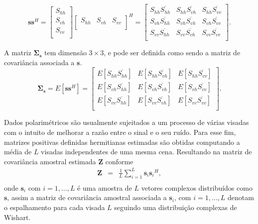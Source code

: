 \begin{equation}\label{cap_acf_6}
\mathbf{s}\mathbf{s}^H = \left[
\begin{array}{c}
	S_{hh}      \\
        S_{vh}     \\
	S_{vv}      \\
\end{array}
\right]
\left[
\begin{array}{ccc}
	S_{hh}  & S_{vh}  & S_{vv}      \\
\end{array}
\right]^H = 
\left[
\begin{array}{ccc}
	S_{hh}\overline{S_{hh}} & S_{hh} \overline{S_{vh}} & S_{hh}  \overline{S_{vv}}     \\
	S_{vh} \overline{S_{hh}}  & S_{vh} \overline{S_{vh}}  & S_{vh} \overline{S_{vv}}      \\
	S_{vv} \overline{S_{hh}}  & S_{vv} \overline{S_{vh}}  & S_{vv}  \overline{S_{vv}}     \\
\end{array}
\right].
\end{equation}

A  matriz $\mathbf \Sigma_{{\mathbf s}}$ tem dimensão $3\times 3$, e pode ser definida como sendo a matriz de covariância associada a $\mathbf{s}$.
\begin{equation}\label{cap_acf_7}
\mathbf{\Sigma_{{\mathbf s}}} = E[\mathbf{s}\mathbf{s}^H] =
\left[
\begin{array}{ccc}
	E[S_{hh}\overline{S_{hh}}] & E[S_{hh} \overline{S_{vh}}] & E[S_{hh}  \overline{S_{vv}}]     \\
	E[S_{vh} \overline{S_{hh}}]  & E[S_{vh} \overline{S_{vh}}]  & E[S_{vh} \overline{S_{vv}}]      \\
	E[S_{vv} \overline{S_{hh}}]  & E[S_{vv} \overline{S_{vh}}]  & E[S_{vv}  \overline{S_{vv}}]     \\
\end{array}
\right].  
\end{equation}

Dados polarimétricos são usualmente sujeitados a um processo de várias visadas com o intuito de melhorar a razão entre o sinal e o seu ruído. Para esse fim, matrizes positivas definidas hermitianas estimadas são obtidas computando a média de $L$ visadas independentes de uma mesma cena. Resultando na matriz de covariância amostral estimada {\bf Z} conforme \citep{good, ade}
\begin{equation}\label{cap_acf_8}
\begin{array}{ccc}
    \mathbf{Z}&=&\frac{1}{L}\displaystyle{\sum_{i=1}^{L} {\mathbf{s}_i}{\mathbf{s}_i}^H}, \\
\end{array}
\end{equation}
onde $\mathbf{s}_i$ com $i = 1, \dots, L$ é uma amostra de $\mathit{L}$ vetores complexos distribuídos como $\mathbf{s}$, assim a matriz de covariância amostral associada a $\mathbf{s}_i$, com $i=1,\dots,L$ denotam o espalhamento para cada visada $L$ seguindo uma distribuição complexas de Wishart. 

